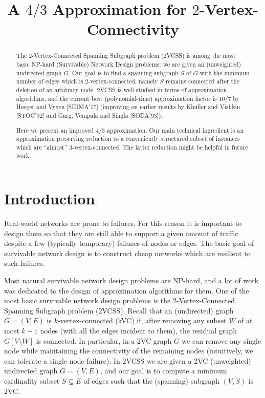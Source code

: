 \documentclass{theoretics}
\title{A \texorpdfstring{$4/3$}{4/3} Approximation for \texorpdfstring{$2$}{2}-Vertex-Connectivity}
\begin{document}
\maketitle

\begin{abstract}
The 2-Vertex-Connected Spanning Subgraph problem (2VCSS) is among the most basic NP-hard (Survivable) Network Design problems: we are given an (unweighted) undirected graph $G$. Our goal is to find a spanning subgraph $S$ of $G$ with the minimum number of edges which is $2$-vertex-connected, namely $S$ remains connected after the deletion of an arbitrary node. 2VCSS is well-studied in terms of approximation algorithms, and the current best (polynomial-time) approximation factor is $10/7$ by Heeger and Vygen [SIDMA'17] (improving on earlier results by Khuller and Vishkin [STOC'92] and Garg, Vempala and Singla [SODA'93]).

Here we present an improved $4/3$ approximation. Our main technical ingredient is an approximation preserving reduction to a conveniently structured subset of instances which are ``almost'' 3-vertex-connected. The latter reduction might be helpful in future work. 
\end{abstract}

\section{Introduction}

Real-world networks are prone to failures. For this reason it is important to design them so that they are still able to support a given amount of traffic despite a few (typically temporary) failures of nodes or edges. The basic goal of survivable network design is to construct cheap networks which are resilient to such failures. 

Most natural survivable network design problems are NP-hard, and a lot of work was dedicated to the design of approximation algorithms for them. One of the most basic survivable network design problems is the 2-Vertex-Connected Spanning Subgraph problem (2VCSS). Recall that an (undirected) graph $G=(V,E)$ is $k$-vertex-connected (kVC) if, after removing any subset $W$ of at most $k-1$ nodes (with all the edges incident to them), the residual graph $G[V\setminus W]$ is connected. In particular, in a 2VC graph $G$ we can remove any single node while maintaining the connectivity of the remaining nodes (intuitively, we can tolerate a single node failure). In 2VCSS we are given a 2VC (unweighted) undirected graph $G=(V,E)$, and our goal is to compute a minimum cardinality subset $S\subseteq E$ of edges such that the (spanning) subgraph $(V,S)$ is 2VC. 
\end{document}
